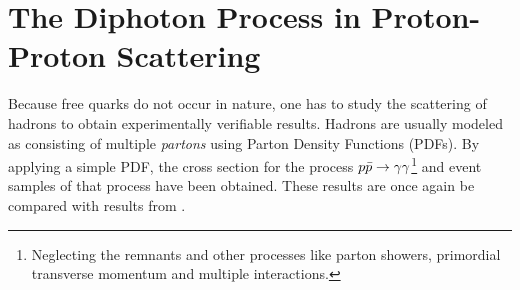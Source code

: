 \chapter{The Diphoton Process in Proton-Proton Scattering}%
\label{chap:pdf}

Because free quarks do not occur in nature, one has to study the
scattering of hadrons to obtain experimentally verifiable
results. Hadrons are usually modeled as consisting of multiple
\emph{partons} using Parton Density Functions (PDFs). By applying a
simple PDF, the cross section for the process
\(p\bar{p}\rightarrow\gamma\gamma\)\footnote{Neglecting the remnants and other processes like
  parton showers, primordial transverse momentum and multiple
  interactions.} and event samples of that process have been
obtained. These results are once again be compared with results from
\sherpa.

